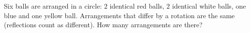 Six balls are arranged in a circle: $2$ identical red balls, $2$ identical white balls, one blue and one yellow ball. Arrangements that differ by a rotation are the same (reflections count as different). How many arrangements are there?
